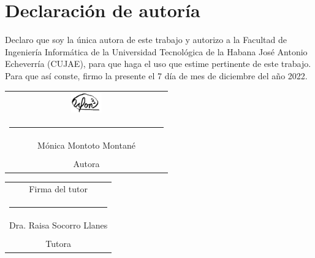 \chapter*{Declaración de autoría}

Declaro que soy la única autora de este trabajo y autorizo a la Facultad de Ingeniería Informática de la Universidad Tecnológica de la Habana José Antonio Echeverría (CUJAE), para que haga el uso que estime pertinente de este trabajo. Para que así conste, firmo la presente el 7 día de mes de diciembre del año 2022.

\vspace{1.5cm}

\begingroup	
\setlength{\tabcolsep}{10pt} %
\renewcommand{\arraystretch}{0.5} %

\begin{tabular}{c}
	\includegraphics[width=0.2\textwidth]{imagen/firma.png}\\
	\noindent\rule{6cm}{0.4pt} \\
	Mónica Montoto Montané \\
    \\
	Autora
\end{tabular}

\vspace{3cm}

\begin{tabular}{c}
	Firma del tutor  \\
	\noindent\rule{6cm}{0.4pt}\\
	Dra. Raisa Socorro Llanes \\
	\\
	Tutora 
\end{tabular}
\endgroup


